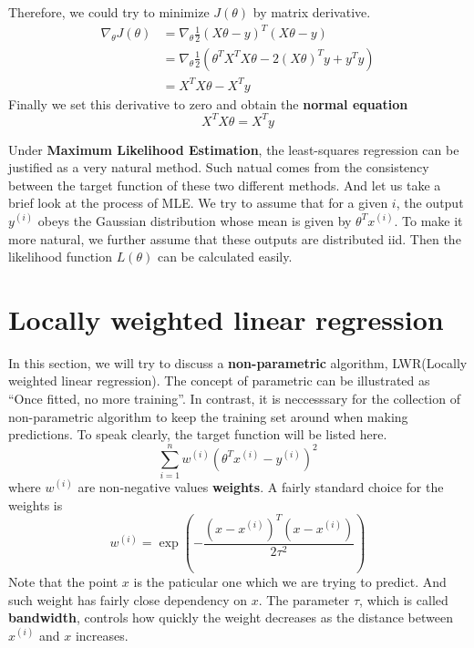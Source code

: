 Therefore, we could try to minimize $J(\theta)$ by matrix derivative.
\begin{align*}
    \nabla_\theta J(\theta) &= \nabla_\theta \frac{1}{2}(X\theta - y)^T(X\theta - y)\\
                            &= \nabla_\theta \frac{1}{2}(\theta^TX^TX\theta - 2(X\theta)^Ty + y^Ty)\\
                            &= X^TX\theta - X^Ty
\end{align*}
Finally we set this derivative to zero and obtain the \textbf{normal equation}
\begin{equation}
    \label{LR: normeq}
    X^TX\theta = X^Ty
\end{equation}

Under \textbf{Maximum Likelihood Estimation}, the least-squares regression can be justified as a very natural method. Such natual comes from the consistency between the target function of these
two different methods. And let us take a brief look at the process of MLE. We try to assume that for a given $i$, the output $y^{(i)}$ obeys the Gaussian distribution whose mean is given by
$\theta^Tx^{(i)}$. To make it more natural, we further assume that these outputs are distributed iid. Then the likelihood function $L(\theta)$ can be calculated easily.

\section{Locally weighted linear regression}

In this section, we will try to discuss a \textbf{non-parametric} algorithm, LWR(Locally weighted linear regression). The concept of parametric can be illustrated as ``Once fitted, no more training''.
In contrast, it is neccesssary for the collection of non-parametric algorithm to keep the training set around when making predictions. To speak clearly, the target function will be listed here.
\begin{equation}
    \label{LR: LWR}
    \sum_{i=1}^{n}w^{(i)}(\theta^Tx^{(i)}-y^{(i)})^2
\end{equation}
where $w^{(i)}$ are non-negative values \textbf{weights}. A fairly standard choice for the weights is 
\[w^{(i)}=\exp\left(-\frac{(x-x^{(i)})^T(x-x^{(i)})}{2\tau^2}\right)\]
Note that the point $x$ is the paticular one which we are trying to predict. And such weight has fairly close dependency on $x$. The parameter $\tau$, which is called \textbf{bandwidth}, controls
how quickly the weight decreases as the distance between $x^{(i)}$ and $x$ increases.

 